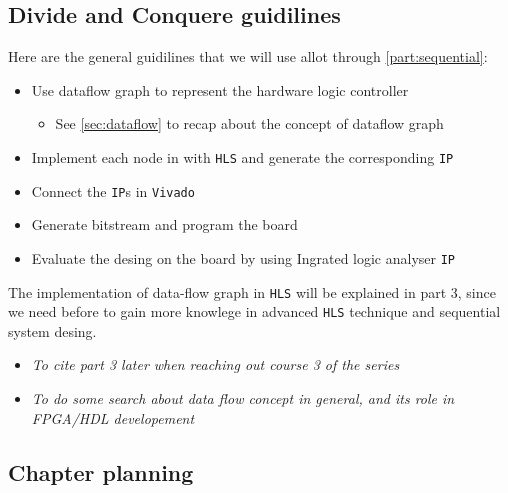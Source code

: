 \newpage
\subsection{Divide and Conquere guidilines}

Here are the general guidilines that we will use allot through \autoref{part:sequential}:

\begin{itemize}

\item Use dataflow graph to represent the hardware logic controller

	\begin{itemize}
	\item See \autoref{sec:dataflow} to recap about the concept of dataflow graph
	\end{itemize}

\item Implement each node in with \verb|HLS| and generate the corresponding \verb|IP|

\item Connect the \verb|IP|s in \verb|Vivado| 

\item Generate bitstream and program the board

\item Evaluate the desing on the board by using Ingrated logic analyser \verb|IP|

\end{itemize}

The implementation of data-flow graph in \verb|HLS| will be explained in part 3, since we need before to gain more knowlege in advanced \verb|HLS| technique and sequential system desing.\\

 

\begin{itemize}

\item \textit{To cite part 3 later when reaching out course 3 of the series}

\item \textit{To do some search about data flow concept in general, and its role in FPGA/HDL developement}

\end{itemize}


\subsection{Chapter planning}


